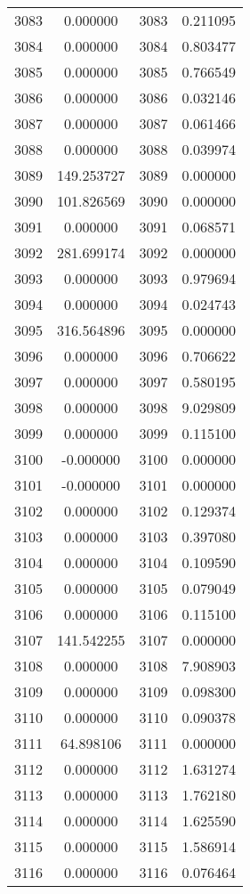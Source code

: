 \documentclass[12pt]{article}
\begin{document}
\begin{longtable}{@{}cccc@{}}
3083 & 0.000000 & 3083 & 0.211095 \\
3084 & 0.000000 & 3084 & 0.803477 \\
3085 & 0.000000 & 3085 & 0.766549 \\
3086 & 0.000000 & 3086 & 0.032146 \\
3087 & 0.000000 & 3087 & 0.061466 \\
3088 & 0.000000 & 3088 & 0.039974 \\
3089 & 149.253727 & 3089 & 0.000000 \\
3090 & 101.826569 & 3090 & 0.000000 \\
3091 & 0.000000 & 3091 & 0.068571 \\
3092 & 281.699174 & 3092 & 0.000000 \\
3093 & 0.000000 & 3093 & 0.979694 \\
3094 & 0.000000 & 3094 & 0.024743 \\
3095 & 316.564896 & 3095 & 0.000000 \\
3096 & 0.000000 & 3096 & 0.706622 \\
3097 & 0.000000 & 3097 & 0.580195 \\
3098 & 0.000000 & 3098 & 9.029809 \\
3099 & 0.000000 & 3099 & 0.115100 \\
3100 & -0.000000 & 3100 & 0.000000 \\
3101 & -0.000000 & 3101 & 0.000000 \\
3102 & 0.000000 & 3102 & 0.129374 \\
3103 & 0.000000 & 3103 & 0.397080 \\
3104 & 0.000000 & 3104 & 0.109590 \\
3105 & 0.000000 & 3105 & 0.079049 \\
3106 & 0.000000 & 3106 & 0.115100 \\
3107 & 141.542255 & 3107 & 0.000000 \\
3108 & 0.000000 & 3108 & 7.908903 \\
3109 & 0.000000 & 3109 & 0.098300 \\
3110 & 0.000000 & 3110 & 0.090378 \\
3111 & 64.898106 & 3111 & 0.000000 \\
3112 & 0.000000 & 3112 & 1.631274 \\
3113 & 0.000000 & 3113 & 1.762180 \\
3114 & 0.000000 & 3114 & 1.625590 \\
3115 & 0.000000 & 3115 & 1.586914 \\
3116 & 0.000000 & 3116 & 0.076464 \\

\end{longtable}
\end{document}
